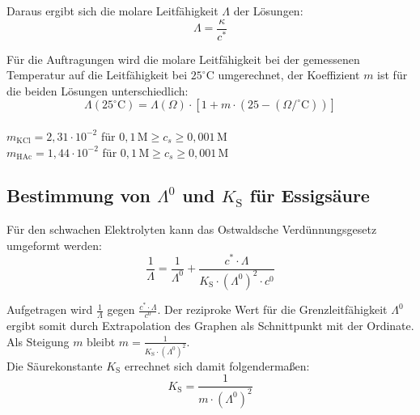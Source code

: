 \documentclass[12pt,a4paper,titlepage,headinclude,bibtotoc]{scrartcl}
\begin{document}
Daraus ergibt sich die molare Leitfähigkeit $\Lambda$ der Lösungen:\\

\begin{equation}
\Lambda = \frac{\kappa}{c^*}
\end{equation}

Für die Auftragungen wird die molare Leitfähigkeit bei der gemessenen Temperatur auf die Leitfähigkeit bei $25^\circ\text{C}$ umgerechnet, der Koeffizient $m$ ist für die beiden Lösungen unterschiedlich:\\

\begin{equation}
\Lambda (25^\circ\text{C}) = \Lambda(\Omega) \cdot [1+ m \cdot (25- (\Omega/^\circ\text{C}))]
\end{equation}\\

{\centering
$m_{\mathrm{KCl}} = 2,31 \cdot 10^{-2}$ für $0,1\, \mathrm{M} \ge c_s \ge 0,001\, \mathrm{M}$\\
$m_{\mathrm{HAc}} = 1,44 \cdot 10^{-2}$ für $0,1\, \mathrm{M} \ge c_s \ge 0,001\, \mathrm{M}$\\}



\subsection{Bestimmung von $\Lambda^0$ und $K_{\mathrm{S}}$ für Essigsäure}

Für den schwachen Elektrolyten kann das Ostwaldsche Verdünnungsgesetz umgeformt werden:\\

\begin{equation}
\frac{1}{\Lambda} = \frac{1}{\Lambda^0} + \frac{c^* \cdot \Lambda}{K_{\mathrm{S}} \cdot (\Lambda^0)^2 \cdot c^0}
\end{equation}

Aufgetragen wird $\frac{1}{\Lambda}$ gegen $\frac{c^* \cdot \Lambda}{c^0}$.
Der reziproke Wert für die Grenzleitfähigkeit $\Lambda^0$ ergibt somit durch Extrapolation des Graphen als Schnittpunkt mit der Ordinate.\\
Als Steigung $m$ bleibt  $m = \frac{1}{K_{\mathrm{S}} \cdot (\Lambda^0)^2 }$.\\
Die Säurekonstante $K_{\mathrm{S}}$ errechnet sich damit folgendermaßen:\\

\begin{equation}
K_{\mathrm{S}} = \frac{1}{m \cdot (\Lambda^0)^2}
\end{equation}
\end{document}
